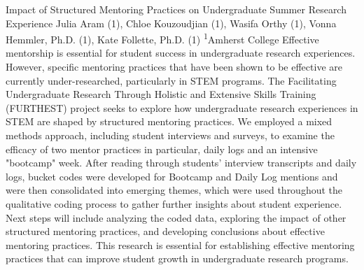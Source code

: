 \makeabstract
{
Impact of Structured Mentoring Practices on Undergraduate Summer Research Experience
}
{
Julia Aram (1), Chloe Kouzoudjian (1), Wasifa Orthy (1), Vonna Hemmler, Ph.D. (1), Kate Follette, Ph.D. (1)
}
{
\textsuperscript{1}Amherst College 
}
{
Effective mentorship is essential for student success in undergraduate research experiences. However, specific mentoring practices that have been shown to be effective are currently under-researched, particularly in STEM programs. The Facilitating Undergraduate Research Through Holistic and Extensive Skills Training (FURTHEST) project seeks to explore how undergraduate research experiences in STEM are shaped by structured mentoring practices. 
}
{
We employed a mixed methods approach, including student interviews and surveys, to examine the efficacy of two mentor practices in particular, daily logs and an intensive "bootcamp" week. 
}
{
After reading through students' interview transcripts and daily logs, bucket codes were developed for Bootcamp and Daily Log mentions and were then consolidated into emerging themes, which were used throughout the qualitative coding process to gather further insights about student experience. Next steps will include analyzing the coded data, exploring the impact of other structured mentoring practices, and developing conclusions about effective mentoring practices. 
}
{
This research is essential for establishing effective mentoring practices that can improve student growth in undergraduate research programs.
}

\newpage
